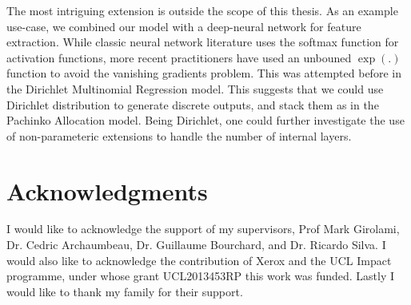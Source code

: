 The most intriguing extension is outside the scope of this thesis. As an example use-case, we combined our model with a deep-neural network for feature extraction. While classic neural network literature\cite{Bishop2006} uses the softmax function for activation functions, more recent practitioners have used an unbouned $\exp(.)$ function to avoid the vanishing gradients problem. This was attempted before in the Dirichlet Multinomial Regression model\cite{Mimno2008}. This suggests that we could use Dirichlet distribution to generate discrete outputs, and stack them as in the Pachinko Allocation model\cite{Li2006}. Being Dirichlet, one could further investigate the use of non-parameteric extensions to handle the number of internal layers.

\section{Acknowledgments}
I would like to acknowledge the support of my supervisors, Prof Mark Girolami, Dr. Cedric Archaumbeau, Dr. Guillaume Bourchard, and Dr. Ricardo Silva. I would also like to acknowledge the contribution of Xerox and the UCL Impact programme, under whose grant UCL2013453RP this work was funded. Lastly I would like to thank my family for their support.







